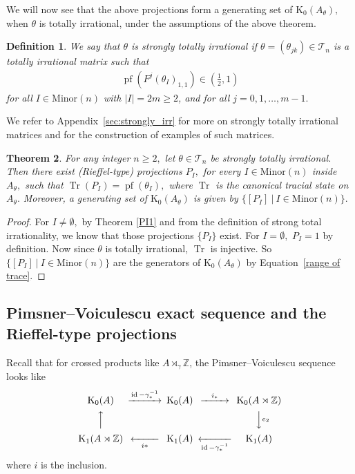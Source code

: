 \documentclass[9pt, BCOR=2mm]{amsart}
\numberwithin{equation}{section}
\numberwithin{equation}{section}
\newtheorem{theorem}{Theorem}[section]
\newtheorem{definition}[theorem]{Definition}
\newcommand{\Z}{{\mathbb{Z}}}
\newcommand{\pf}{{\operatorname{pf}}}
\newcommand{\K}{\mathrm{K}} %
\DeclareMathOperator{\Tr}{Tr}
\DeclareMathOperator{\id}{id}
\newcommand{\m}[2]{\ensuremath{{#1}_{#2}}}
\begin{document}
We will now see that the above projections form a generating set of $\K_0(A_\theta),$ when $\theta$ is totally irrational, under the assumptions of the above theorem.

\begin{definition}\label{a3}
 We say that $\theta$ is {\it strongly totally irrational} if $\theta=(\theta_{jk})\in \mathcal{T}_n$ is a totally irrational matrix such that
 \begin{eqnarray}\label{a2}
 {\pf}(F^{j}(\m{\theta}{I})_{1,1})\in (\frac{1}{2},1) 
 \end{eqnarray}
for all $I \in \mathrm{Minor}(n)$ with $|I|=2m\geq 2$,  and for all $j=0,1,\dots,m-1.$ 
\end{definition}
We refer to Appendix~\ref{sec:strongly_irr} for more on strongly totally irrational matrices and for the construction of examples of such matrices.
\begin{theorem}\label{PI}
  For any integer $n\geq 2,$ let $\theta\in \mathcal{T}_n$ be strongly totally irrational. Then there exist  (Rieffel-type) projections $P_{I},$ for every $I \in \mathrm{Minor}(n)$ inside $A_{\theta},$ such that
 $\label{pI1}\Tr(P_{I})={\pf}(\m{\theta}{I}),$
  where $\Tr$ is the canonical tracial state on $A_{\theta}.$  Moreover, a generating set of $\K_0(A_{\theta})$ is given by  $\{[P_{I}]~|~I \in \mathrm{Minor}(n)\}.$ 
\end{theorem}
\begin{proof} For $I\neq \emptyset,$ by Theorem \ref{PI1} and from the definition of strong total irrationality,  we know that those projections $\{P_{I}\}$ exist. For $I= \emptyset,$  $P_{I}=1$ by definition.
  Now since $\theta$ is totally irrational, $\Tr$ is injective. So $\{[P_{I}]~|~I \in \mathrm{Minor}(n)\}$ are the generators of $\K_0(A_{\theta})$ by Equation~\ref{range of trace}.
\end{proof}

 
 
 
\subsection{Pimsner--Voiculescu exact sequence and the Rieffel-type projections}\label{sec:pv_generators}	
Recall that for crossed products like $A \rtimes_\gamma \Z$, the Pimsner--Voiculescu sequence looks like 
{\[
\begin{CD}
\K_0 (A) @>{\id -\gamma_{*}^{-1}}>>\K_0 (A)@>{i_*}>> \K_0 (A\rtimes \Z)   \\
@A{}AA & &  @VV{e_2}V            \\
 \K_1 (A\rtimes \Z) @<<{i*}<  \K_1 (A) @<<{\id -\gamma_{*}^{-1}}< \K_1 (A)
\end{CD}
\]} 
where $i$ is the inclusion. 
\end{document}

